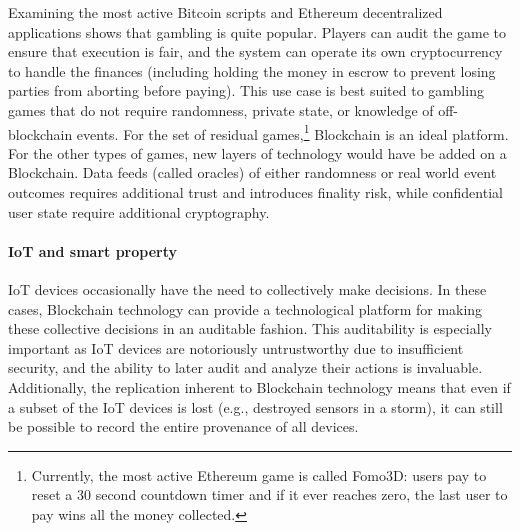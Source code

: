 Examining the most active Bitcoin scripts and Ethereum decentralized applications shows that gambling is quite popular. Players can audit the game to ensure that execution is fair, and the system can operate its own cryptocurrency to handle the finances (including holding the money in escrow to prevent losing parties from aborting before paying). This use case is best suited to gambling games that do not require randomness, private state, or knowledge of off-blockchain events. For the set of residual games,\footnote{Currently, the most active Ethereum game is called Fomo3D: users pay to reset a 30 second countdown timer and if it ever reaches zero, the last user to pay wins all the money collected.} Blockchain is an ideal platform. For the other types of games, new layers of technology would have be added on a Blockchain. Data feeds (called oracles) of either randomness or real world event outcomes requires additional trust and introduces finality risk, while confidential user state require additional cryptography.  

\paragraph{IoT and smart property}
IoT devices occasionally have the need to collectively make decisions.
In these cases, Blockchain technology can provide a technological platform for making these collective decisions in an auditable fashion.
This auditability is especially important as IoT devices are notoriously untrustworthy due to insufficient security, and the ability to later audit and analyze their actions is invaluable.
Additionally, the replication inherent to Blockchain technology means that even if a subset of the IoT devices is lost (e.g., destroyed sensors in a storm), it can still be possible to record the entire provenance of all devices.



